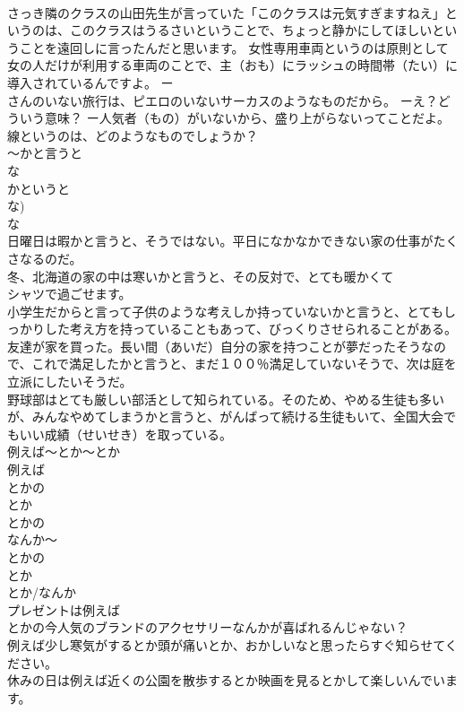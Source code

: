 \documentclass[8pt]{extreport}
\begin{document}
\begin{CJK}{UTF8}{min}
\\	さっき隣のクラスの山田先生が言っていた「このクラスは元気すぎますねえ」というのは、このクラスはうるさいということで、ちょっと静かにしてほしいということを遠回しに言ったんだと思います。 女性専用車両というのは原則として女の人だけが利用する車両のことで、主（おも）にラッシュの時間帯（たい）に導入されているんですよ。 ー
\\	さんのいない旅行は、ピエロのいないサーカスのようなものだから。 ーえ？どういう意味？ ー人気者（もの）がいないから、盛り上がらないってことだよ。 線というのは、どのようなものでしょうか？ 
\\	～かと言うと 
\\	な
\\	かというと 
\\	な) 
\\	な 
\\	日曜日は暇かと言うと、そうではない。平日になかなかできない家の仕事がたくさなるのだ。 
\\	冬、北海道の家の中は寒いかと言うと、その反対で、とても暖かくて
\\	シャツで過ごせます。 
\\	小学生だからと言って子供のような考えしか持っていないかと言うと、とてもしっかりした考え方を持っていることもあって、びっくりさせられることがある。 
\\	友達が家を買った。長い間（あいだ）自分の家を持つことが夢だったそうなので、これで満足したかと言うと、まだ１００％満足していないそうで、次は庭を立派にしたいそうだ。 
\\	野球部はとても厳しい部活として知られている。そのため、やめる生徒も多いが、みんなやめてしまうかと言うと、がんばって続ける生徒もいて、全国大会でもいい成績（せいせき）を取っている。 
\\	例えば～とか～とか	
\\	例えば 
\\	とかの
\\	とか 
\\	とかの
\\	なんか～ 
\\	とかの
\\	とか 
\\	とか/なんか 
\\	プレゼントは例えば
\\	とかの今人気のブランドのアクセサリーなんかが喜ばれるんじゃない？ 
\\	例えば少し寒気がするとか頭が痛いとか、おかしいなと思ったらすぐ知らせてください。 
\\	休みの日は例えば近くの公園を散歩するとか映画を見るとかして楽しいんでいます。 

\end{CJK}
\end{document}
